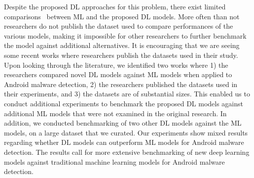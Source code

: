    Despite the proposed DL approaches for this problem, there exist limited
   comparisons~\cite{Yuan:SIGCOMM14, Wang:JAIHC19,Shar:MOBILESoft20, Nadia:MALHat21, Sun:esem24}
   between ML and the proposed DL models.
 More often than not researchers do not publish the
dataset used to compare performances of the various models, making it
impossible for other researchers to further benchmark
the model against additional alternatives. It is encouraging that we
are seeing some recent works where researchers publish the datasets used
in their study. Upon looking through the literature, we identified two
works where 1) the researchers compared novel DL models against
ML models when applied to Android malware detection,
2) the researchers published the datasets used in their experiments,
and 3) the datasets are of substantial sizes.  
This enabled us to conduct additional experiments to benchmark the
proposed DL models against additional ML models that were not
examined in the original research.
In addition, we conducted benchmarking of two other DL models
 against the ML models, on a large dataset that we curated.
Our experiments show
 mixed results regarding whether DL models can outperform 
ML models for Android malware detection.
The results call for more extensive benchmarking of new deep learning models
against traditional machine learning models for
Android malware detection.






